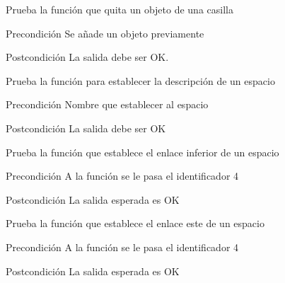 \begin{DoxyRefList}
\item[\label{test__test000307}%
\hypertarget{test__test000307}{}%
Global \hyperlink{space__test_8c_a8edeba07aa351da3c1b4bdf4a18c2f7b}{test1\-\_\-space\-\_\-remove\-\_\-object} ()]Prueba la función que quita un objeto de una casilla \begin{DoxyPrecond}{Precondición}
Se añade un objeto previamente 
\end{DoxyPrecond}
\begin{DoxyPostcond}{Postcondición}
La salida debe ser O\-K.  
\end{DoxyPostcond}

\item[\label{test__test000245}%
\hypertarget{test__test000245}{}%
Global \hyperlink{space__test_8c_a19a1bac3ab9cc6f5bf7ea8c4a72392c4}{test1\-\_\-space\-\_\-set\-\_\-description} ()]Prueba la función para establecer la descripción de un espacio \begin{DoxyPrecond}{Precondición}
Nombre que establecer al espacio 
\end{DoxyPrecond}
\begin{DoxyPostcond}{Postcondición}
La salida debe ser O\-K  
\end{DoxyPostcond}

\item[\label{test__test000268}%
\hypertarget{test__test000268}{}%
Global \hyperlink{space__test_8c_acfdc180b8543b1fd7e320423416a7eec}{test1\-\_\-space\-\_\-set\-\_\-down} ()]Prueba la función que establece el enlace inferior de un espacio \begin{DoxyPrecond}{Precondición}
A la función se le pasa el identificador 4 
\end{DoxyPrecond}
\begin{DoxyPostcond}{Postcondición}
La salida esperada es O\-K  
\end{DoxyPostcond}

\item[\label{test__test000259}%
\hypertarget{test__test000259}{}%
Global \hyperlink{space__test_8c_ab1f093af4be3ca8e525d0517cc846f47}{test1\-\_\-space\-\_\-set\-\_\-east} ()]Prueba la función que establece el enlace este de un espacio \begin{DoxyPrecond}{Precondición}
A la función se le pasa el identificador 4 
\end{DoxyPrecond}
\begin{DoxyPostcond}{Postcondición}
La salida esperada es O\-K  
\end{DoxyPostcond}


\end{DoxyRefList}
